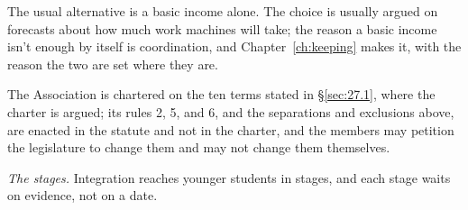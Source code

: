 The usual alternative is a basic income alone. The choice is usually argued on forecasts about how much work machines will take; the reason a basic income isn't enough by itself is coordination, and Chapter~\ref{ch:keeping} makes it, with the reason the two are set where they are.

The Association is chartered on the ten terms stated in \S\ref{sec:27.1}, where the charter is argued; its rules 2, 5, and 6, and the separations and exclusions above, are enacted in the statute and not in the charter, and the members may petition the legislature to change them and may not change them themselves.


\emph{The stages.} Integration reaches younger students in stages, and each stage waits on evidence, not on a date.

